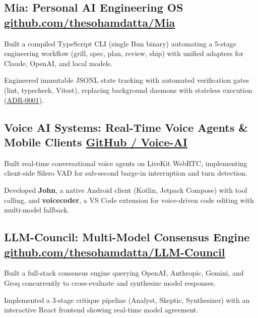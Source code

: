 
\subsection[Mia: Personal AI Engineering OS]{{Mia}: \textnormal{Personal AI Engineering OS} \hfill \href{https://github.com/thesohamdatta/Mia}{github.com/thesohamdatta/Mia}}
\begin{zitemize}
\item Built a compiled TypeScript CLI (single Bun binary) automating a 5-stage engineering workflow (grill, spec, plan, review, ship) with unified adapters for Claude, OpenAI, and local models.
\item Engineered immutable JSONL state tracking with automated verification gates (lint, typecheck, Vitest), replacing background daemons with stateless execution (\href{https://github.com/thesohamdatta/Mia/blob/main/docs/decisions/ADR-0001-eliminate-daemon.md}{ADR-0001}).
\end{zitemize}

\subsection[Voice AI Systems: Real-Time Agents and Clients]{{Voice AI Systems}: \textnormal{Real-Time Voice Agents \& Mobile Clients} \hfill \href{https://github.com/thesohamdatta/John}{GitHub / Voice-AI}}
\begin{zitemize}
\item Built real-time conversational voice agents on LiveKit WebRTC, implementing client-side Silero VAD for sub-second barge-in interruption and turn detection.
\item Developed \textbf{John}, a native Android client (Kotlin, Jetpack Compose) with tool calling, and \textbf{voicecoder}, a VS Code extension for voice-driven code editing with multi-model fallback.
\end{zitemize}

\subsection[LLM-Council: Multi-Model Consensus Engine]{{LLM-Council}: \textnormal{Multi-Model Consensus Engine} \hfill \href{https://github.com/thesohamdatta/LLM-Council}{github.com/thesohamdatta/LLM-Council}}
\begin{zitemize}
\item Built a full-stack consensus engine querying OpenAI, Anthropic, Gemini, and Groq concurrently to cross-evaluate and synthesize model responses.
\item Implemented a 3-stage critique pipeline (Analyst, Skeptic, Synthesizer) with an interactive React frontend showing real-time model agreement.
\end{zitemize}
\vspace{-0.3em}
